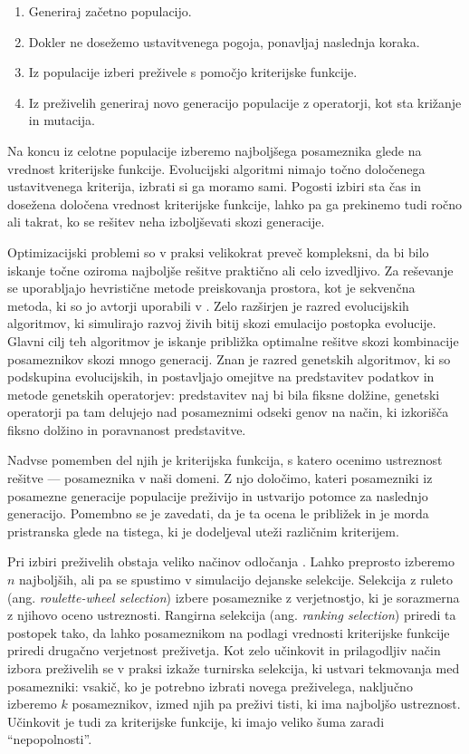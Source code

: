 \documentclass[a4paper,12pt]{book}
\begin{document}
\begin{enumerate}
\item Generiraj začetno populacijo. 
\item Dokler ne dosežemo ustavitvenega pogoja, ponavljaj naslednja koraka. 
\item Iz populacije izberi preživele s pomočjo kriterijske funkcije.
\item Iz preživelih generiraj novo generacijo populacije z operatorji, kot sta križanje in mutacija. 
\end{enumerate}

Na koncu iz celotne populacije izberemo najboljšega posameznika glede na vrednost kriterijske funkcije. Evolucijski algoritmi nimajo točno določenega ustavitvenega kriterija, izbrati si ga moramo sami. Pogosti izbiri sta čas in dosežena določena vrednost kriterijske funkcije, lahko pa ga prekinemo tudi ročno ali takrat, ko se rešitev neha izboljševati skozi generacije. 

Optimizacijski problemi so v praksi velikokrat \cite{cooper1996complexity} preveč kompleksni, da bi bilo iskanje točne oziroma najboljše rešitve praktično ali celo izvedljivo. Za reševanje se uporabljajo hevristične metode preiskovanja prostora, kot je sekvenčna metoda, ki so jo avtorji uporabili v \cite{burke1998simple}. Zelo razširjen je razred evolucijskih algoritmov, ki simulirajo razvoj živih bitij skozi emulacijo postopka evolucije. Glavni cilj teh algoritmov je iskanje približka optimalne rešitve skozi kombinacije posameznikov skozi mnogo generacij. Znan je razred genetskih algoritmov, ki so podskupina evolucijskih, in postavljajo omejitve na predstavitev podatkov in metode genetskih operatorjev: predstavitev naj bi bila fiksne dolžine, genetski operatorji pa tam delujejo nad posameznimi odseki genov na način, ki izkorišča fiksno dolžino in poravnanost predstavitve. 

Nadvse pomemben del njih je kriterijska funkcija, s katero ocenimo ustreznost rešitve --- posameznika v naši domeni. Z njo določimo, kateri posamezniki iz posamezne generacije populacije preživijo in ustvarijo potomce za naslednjo generacijo. Pomembno se je zavedati, da je ta ocena le približek in je morda pristranska glede na tistega, ki je dodeljeval uteži različnim kriterijem. 

Pri izbiri preživelih obstaja veliko načinov odločanja \cite{thierens1994convergence}. Lahko preprosto izberemo $n$ najboljših, ali pa se spustimo v simulacijo dejanske selekcije. Selekcija z ruleto (ang. \emph{roulette-wheel selection}) izbere posameznike z verjetnostjo, ki je sorazmerna z njihovo oceno ustreznosti. Rangirna selekcija (ang. \emph{ranking selection}) priredi ta postopek tako, da lahko posameznikom na podlagi vrednosti kriterijske funkcije priredi drugačno verjetnost preživetja. Kot zelo učinkovit in prilagodljiv način izbora preživelih se v praksi izkaže \cite{miller1995genetic} turnirska selekcija, ki ustvari tekmovanja med posamezniki: vsakič, ko je potrebno izbrati novega preživelega, naključno izberemo $k$ posameznikov, izmed njih pa preživi tisti, ki ima najboljšo ustreznost. Učinkovit je tudi za kriterijske funkcije, ki imajo veliko šuma \cite{miller1995genetic} zaradi ``nepopolnosti''. 
\end{document}
